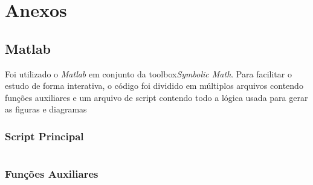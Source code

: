 \documentclass[a4paper,11pt]{article}
\begin{document}
\newpage


\newpage
\section*{Anexos}



\subsection*{Matlab}

Foi utilizado o \textit{Matlab} em conjunto da toolbox\textit{Symbolic Math}\cite{matlabsymbolic}. Para facilitar o estudo de forma interativa, o código foi dividido em múltiplos arquivos contendo funções auxiliares e um arquivo de script contendo todo a lógica usada para gerar as figuras e diagramas

\subsubsection*{Script Principal}

\inputminted[xleftmargin=15pt,linenos,frame=single,framesep=5pt,breaklines=true]{matlab}{../matlab/petrinetproject.m}

\subsubsection*{Funções Auxiliares}
\end{document}
